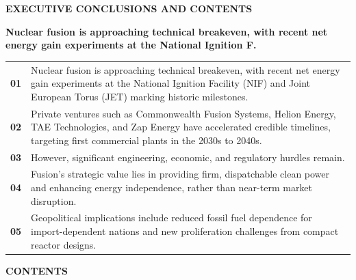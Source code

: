 \documentclass[10pt,a4paper]{article}
\begin{document}
{\textcolor{BOBlue}{\scriptsize\bfseries EXECUTIVE CONCLUSIONS AND CONTENTS}}\par\vspace{-1pt}
{\Large\sffamily\bfseries\color{BONavy} Nuclear fusion is approaching technical breakeven, with recent net energy gain experiments at the National Ignition F.}\par\vspace{4pt}
\vspace{2pt}{\color{BOBright}\rule{\linewidth}{1pt}}\vspace{5pt}
\begin{tabularx}{\linewidth}{p{12mm}Y}
\textcolor{BOBlue}{\bfseries 01} & {\footnotesize Nuclear fusion is approaching technical breakeven, with recent net energy gain experiments at the National Ignition Facility (NIF) and Joint European Torus (JET) marking historic milestones.} \\[4pt]
\textcolor{BOBlue}{\bfseries 02} & {\footnotesize Private ventures such as Commonwealth Fusion Systems, Helion Energy, TAE Technologies, and Zap Energy have accelerated credible timelines, targeting first commercial plants in the 2030s to 2040s.} \\[4pt]
\textcolor{BOBlue}{\bfseries 03} & {\footnotesize However, significant engineering, economic, and regulatory hurdles remain.} \\[4pt]
\textcolor{BOBlue}{\bfseries 04} & {\footnotesize Fusion's strategic value lies in providing firm, dispatchable clean power and enhancing energy independence, rather than near-term market disruption.} \\[4pt]
\textcolor{BOBlue}{\bfseries 05} & {\footnotesize Geopolitical implications include reduced fossil fuel dependence for import-dependent nations and new proliferation challenges from compact reactor designs.} \\[4pt]
\end{tabularx}
\vspace{6pt}
{\textcolor{BOBlue}{\scriptsize\bfseries CONTENTS}}\par\vspace{2pt}
\end{document}
